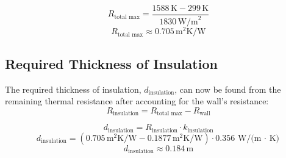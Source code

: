\documentclass{article}
\begin{document}
\[ R_{\text{total max}} = \frac{1588 \, \text{K} - 299 \, \text{K}}{1830 \, \text{W/m}^2} \]
\[ R_{\text{total max}} \approx 0.705 \, \text{m}^2\text{K/W} \]

\subsection{Required Thickness of Insulation}
The required thickness of insulation, \( d_{\text{insulation}} \), can now be found from the remaining thermal resistance after accounting for the wall's resistance:
\[ R_{\text{insulation}} = R_{\text{total max}} - R_{\text{wall}} \]

\[ d_{\text{insulation}} = R_{\text{insulation}} \cdot k_{\text{insulation}} \]
\[ d_{\text{insulation}} = (0.705 \, \text{m}^2\text{K/W} - 0.1877 \, \text{m}^2\text{K/W}) \cdot 0.356 \, \text{W/(m \(\cdot\) K)} \]
\[ d_{\text{insulation}} \approx 0.184 \, \text{m} \]
\end{document}
